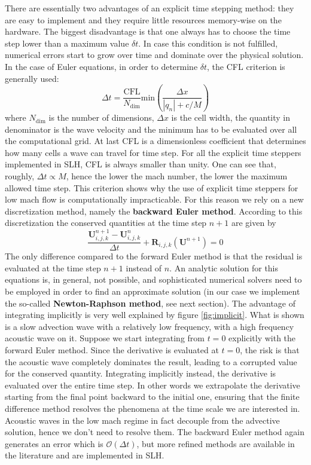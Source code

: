 There are essentially two advantages of an explicit time stepping method: they are easy to implement and they require little resources memory-wise on the hardware. The biggest disadvantage is that one always has to choose the time step lower than a maximum value $\delta t$. In case this condition is not fulfilled, numerical errors start to grow over time and dominate over the physical solution. In the case of Euler equations, in order to determine $\delta t$, the CFL criterion is generally used:
\begin{equation}\label{eq:cfl}
	\Delta t = \frac{\mathrm{CFL}}{N_{\mathrm{dim}}}\mathrm{min} \left(  \frac{\Delta x}{|q_n| + c/M}   \right)
\end{equation}
where $N_{\mathrm{dim}}$ is the number of dimensions, $\Delta x$ is the cell width, the quantity in denominator is the wave velocity and the minimum has to be evaluated over all the computational grid. At last CFL is a dimensionless coefficient that determines how many cells a wave can travel for time step. For all the explicit time steppers implemented in SLH, CFL is always smaller than unity. One can see that, roughly, $\Delta t \propto M$, hence the lower the mach number, the lower the maximum allowed time step. This criterion shows why the use of explicit time steppers for low mach flow is computationally impracticable.
For this reason we rely on a new discretization method, namely the \textbf{backward Euler method}. According to this discretization the conserved quantities at the time step $n+1$ are given by
\begin{equation}\label{eq:backward}
	\frac{\mathbf{U}^{n+1}_{i, j, k} - \mathbf{U}^{n}_{i, j, k}}{\Delta t} + \mathbf{R}_{i, j, k}(\mathbf{U}^{n+1})=0
\end{equation}
The only difference compared to the forward Euler method is that the residual is evaluated at the time step $n+1$ instead of $n$. An analytic solution for this equations is, in general, not possible, and sophisticated numerical solvers need to be employed in order to find an approximate solution (in our case we implement the so-called \textbf{Newton-Raphson method}, see next section). The advantage of integrating implicitly is very well explained by figure \ref{fig:implicit}. What is shown is a slow advection wave with a relatively low frequency, with a high frequency acoustic wave on it. Suppose we start integrating from $t=0$ explicitly with the forward Euler method. Since the derivative is evaluated at $t=0$, the risk is that the acoustic wave completely dominates the result, leading to a corrupted value for the conserved quantity. Integrating implicitly instead, the derivative is evaluated over the entire time step. In other words we extrapolate the derivative starting from the final point backward to the initial one, ensuring that the finite difference method resolves the phenomena at the time scale we are interested in. Acoustic waves in the low mach regime in fact decouple from the advective solution, hence we don't need to resolve them. The backward Euler method again generates an error which is $\mathcal{O}(\Delta t)$, but more refined methods are available in the literature and are implemented in SLH. 

